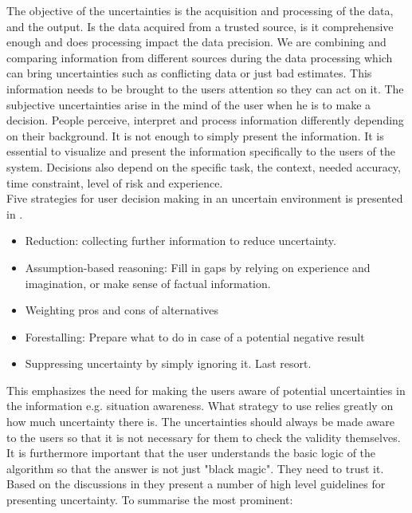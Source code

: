 The objective of the uncertainties is the acquisition and processing of the data, and the output. Is the data acquired from a trusted source, is it comprehensive enough and does processing impact the data precision. We are combining and comparing information from different sources during the data processing which can bring uncertainties such as conflicting data or just bad estimates. This information needs to be brought to the users attention so they can act on it. The subjective uncertainties arise in the mind of the user when he is to make a decision. People perceive, interpret and process information differently depending on their background. It is not enough to simply present the information. It is essential to visualize and present the information specifically to the users of the system. Decisions also depend on the specific task, the context, needed accuracy, time constraint, level of risk and experience. 
\\[0.5cm]
Five strategies for user decision making in an uncertain environment is presented in \cite{UncertainInformation}. 
\begin{itemize}
\item Reduction: collecting further information to reduce uncertainty.
\item Assumption-based reasoning: Fill in gaps by relying on experience and imagination, or make sense of factual information.
\item Weighting pros and cons of alternatives
\item Forestalling: Prepare what to do in case of a potential negative result
\item Suppressing uncertainty by simply ignoring it. Last resort.
\end{itemize}  
This emphasizes the need for making the users aware of potential uncertainties in the information e.g. situation awareness. What strategy to use relies greatly on how much uncertainty there is. The uncertainties should always be made aware to the users so that it is not necessary for them to check the validity themselves. It is furthermore important that the user understands the basic logic of the algorithm so that the answer is not just "black magic". They need to trust it.
\\[0.5cm]
Based on the discussions in \cite{UncertainInformation} they present a number of high level guidelines for presenting uncertainty. To summarise the most prominent:

